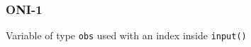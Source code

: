 \subsubsection{ONI-1}\label{sec:error_code_oni_1}

Variable of type \texttt{obs} used with an index inside \texttt{input()}


